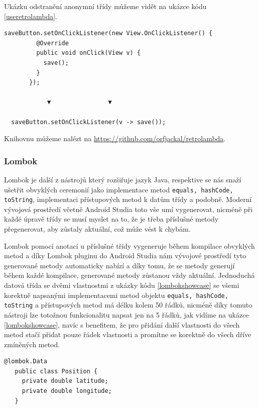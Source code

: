 \documentclass{article}
\begin{document}
Ukázku odstranění anonymní třídy můžeme vidět na ukázce kódu \ref{useretrolambda}.

\begin{lstlisting}[label=useretrolambda,caption=Odstrnění kódu anonymní třídy pomocí knihovny Retrolambda]
   saveButton.setOnClickListener(new View.OnClickListener() {
         @Override
         public void onClick(View v) {
           save();
         }
       });

            ▼                ▼

  saveButton.setOnClickListener(v -> save());
\end{lstlisting}

Knihovnu můžeme nalézt na \url{https://github.com/orfjackal/retrolambda}.

\subsubsection{Lombok}
Lombok je další z nástrojů který rozšiřuje jazyk Java, respektive se nás snaží ušetřit obvyklých
ceremonií jako implementace metod \texttt{equals, hashCode, toString}, implementaci přístupových
metod k datům třídy a podobně. Moderní vývojová prostředí včetně Android Studia toto vše umí
vygenerovat, nicméně při každé úpravě třídy se musí myslet na to, že je třeba příslušné metody
přegenerovat, aby zůstaly aktuální, což může vést k chybám.

Lombok pomocí anotací u příslušné třídy vygeneruje během kompilace obvyklých metod a díky Lombok
pluginu do Android Studia nám vývojové prostředí tyto generované metody automaticky nabízí a díky tomu,
že se metody generují během každé kompilace, generované metody zůstanou vždy aktuální. Jednoduchá datová
třída se dvěmi vlastnostmi z ukázky kódu \ref{lombokshowcase} se všemi korektně napsanými implementacemi
metod objektu \texttt{equals, hashCode, toString} a přístupových metod má délku kolem 50 řádků, nicméně
díky tomuto nástroji lze totožnou funkcionalitu napsat jen na 5 řádků, jak vidíme na ukázce \ref{lombokshowcase},
navíc s benefitem, že pro přidání další vlastnosti do všech metod stačí přidat pouze řádek vlastnosti
a promítne se korektně do všech dříve zmíněných metod.

\begin{lstlisting}[label=lombokshowcase,caption=Datová třída používající Lombok]
   @lombok.Data
   public class Position {
     private double latitude;
     private double longitude;
   }
\end{lstlisting}
\end{document}
